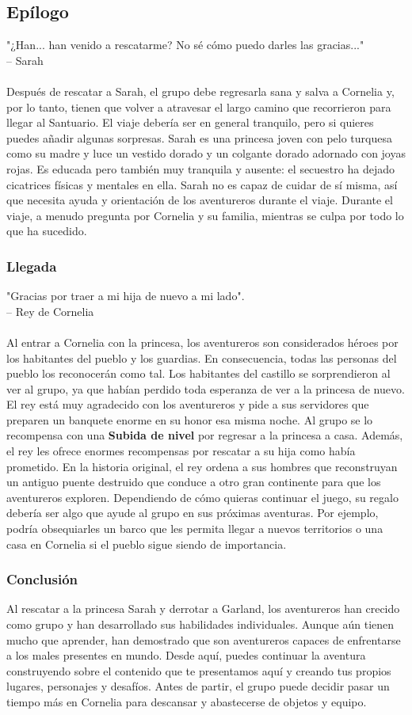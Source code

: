 \subsection*{Epílogo}
"¿Han... han venido a rescatarme? No sé cómo puedo darles las gracias..." \\ 
\indent -- Sarah \\\\ 
Después de rescatar a Sarah, el grupo debe regresarla sana y salva a Cornelia y, por lo tanto, tienen que volver a atravesar el largo camino que recorrieron para llegar al Santuario. El viaje debería ser en general tranquilo, pero si quieres puedes añadir algunas sorpresas. Sarah es una princesa joven con pelo turquesa como su madre y luce un vestido dorado y un colgante dorado adornado con joyas rojas. Es educada pero también muy tranquila y ausente: el secuestro ha dejado cicatrices físicas y mentales en ella. Sarah no es capaz de cuidar de sí misma, así que necesita ayuda y orientación de los aventureros durante el viaje. Durante el viaje, a menudo pregunta por Cornelia y su familia, mientras se culpa por todo lo que ha sucedido. 

\subsubsection*{Llegada}
"Gracias por traer a mi hija de nuevo a mi lado". \\ 
\indent -- Rey de Cornelia \\\\ 
Al entrar a Cornelia con la princesa, los aventureros son considerados héroes por los habitantes del pueblo y los guardias. En consecuencia, todas las personas del pueblo los reconocerán como tal. Los habitantes del castillo se sorprendieron al ver al grupo, ya que habían perdido toda esperanza de ver a la princesa de nuevo. El rey está muy agradecido con los aventureros y pide a sus servidores que preparen un banquete enorme en su honor esa misma noche. Al grupo se lo recompensa con una \textbf{Subida de nivel} por regresar a la princesa a casa. Además, el rey les ofrece enormes recompensas por rescatar a su hija como había prometido. En la historia original, el rey ordena a sus hombres que reconstruyan un antiguo puente destruido que conduce a otro gran continente para que los aventureros exploren. Dependiendo de cómo quieras continuar el juego, su regalo debería ser algo que ayude al grupo en sus próximas aventuras. Por ejemplo, podría obsequiarles un barco que les permita llegar a nuevos territorios o una casa en Cornelia si el pueblo sigue siendo de importancia. \subsubsection*{Conclusión}
Al rescatar a la princesa Sarah y derrotar a Garland, los aventureros han crecido como grupo y han desarrollado sus habilidades individuales. Aunque aún tienen mucho que aprender, han demostrado que son aventureros capaces de enfrentarse a los males presentes en mundo. Desde aquí, puedes continuar la aventura construyendo sobre el contenido que te presentamos aquí y creando tus propios lugares, personajes y desafíos. Antes de partir, el grupo puede decidir pasar un tiempo más en Cornelia para descansar y abastecerse de objetos y equipo.
